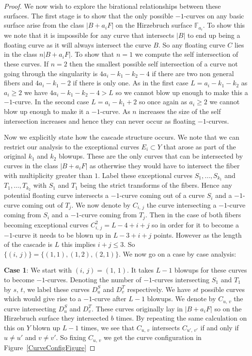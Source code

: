 \documentclass[12pt]{amsbook}
\theoremstyle{plain}
\newcommand{\mb}[1]{\mathbb{#1}}
\begin{document}
\begin{proof}
We now wish to explore the birational relationships between these surfaces. The first stage is to show that the only possible $-1$-curves on any basic surface arise from the class $|B+ a_i F|$ on the Hirzebruch surface $\mb{F}_{a_i}$. To show this we note that it is impossible for any curve that intersects $|B|$ to end up being a floating curve as it will always intersect the curve $B$. So any floating curve $C$ lies in the class $n|B+a_i F|$. To show that $n=1$ we compute the self intersection of these curves. If $n=2$ then the smallest possible self intersection of a curve not going through the singularity  is $4a_i - k_1 - k_2 - 4$ if there are two non general fibers and $4a_i - k_1 -2$ if there is only one. As in the first case $L = a_i- k_1-k_2$ as $a_i \geq 2 $  we have $4a_i -k_1-k_2 - 4 > L$ so we cannot blow up enough to make this a $-1$-curve. In the second case $L = a_i -k_1+2$ so once again as $a_i \geq 2$  we cannot blow up enough to make it a $-1$-curve. As $n$ increases the size of the self intersection increases and hence they can never occur as floating $-1$-curves.


Now we explicitly state how the cascade structure occurs. We note that we can restrict our analysis to the exceptional curves $E_i \subset Y$ that arose as part of the original $k_1$ and $k_2$ blowups. These are the only curves that can be intersected by curves in the class $|B + a_i F|$ as otherwise they would have to intersect the fiber with multiplicity greater than $1$. Label these exceptional curves $S_1, \dots ,S_{k_1}$ and $T_1, \dots , T_{k_2}$ with $S_{1}$ and $T_{1}$ being the strict transforms of the fibers. Hence any potential floating curve intersects a $-1$-curve coming out of a curve $S_i$ and a $-1$-curve coming out of $T_j$. We now denote by $C_{i,\, j}$ the curve intersecting a $-1$-curve coming from $S_i$ and a $-1$-curve coming from $T_j$. Then in the case of both fibers becoming exceptional curves $C_{i, \, j}^2 = L- 4 + i + j$ so in order for it to become a $-1$-curve it needs to be blown up in $L - 3 + i + j$ points. However as the length of the cascade is $L$ this implies $i+j \leq 3$. So $\{ (i, \, j) \} = \{(1,1), (1,2), (2,1) \} $. We now go on a case by case analysis:


\textbf{Case 1}: We start with $(i, \, j)  = (1,\, 1)$. It takes $L - 1$ blowups for these curves to become $-1$-curves. Denoting the number of $-1$-curves intersecting $S_1$ and $T_1$ by $s, \, t$, we label these curves $D_u^S$ and $D_v^T$ respectively. We have $st$ possible curves which would give rise to a $-1$-curve after $L-1$ blowups. We denote by $C_{u, \, v}$ the curve intersecting $D_u^S$ and $D_v^T$. These curves originally lay in $|B+ a_i F|$ so on the Hirzebruch surface they intersected $b$ times. By repeating the same calculation on  this on $Y$ blown up $L-1$ times, we see that $C_{u,\, v}$ intersects $C_{u' , \, v'}$ if and only if $u \neq u'$ and $v \neq v'$. So fixing $C_{u, \, v}$ we get the curve configuration in Figure~\ref{CurveConfigFigure}


\end{proof}
\end{document}
